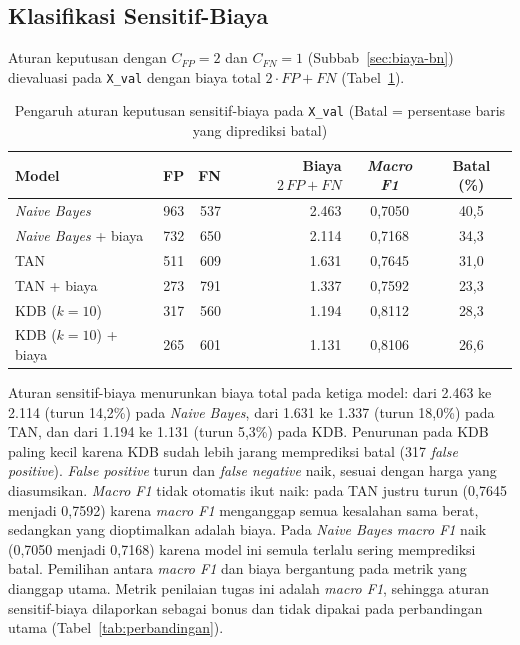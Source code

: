 \subsection{Klasifikasi Sensitif-Biaya}

Aturan keputusan dengan $C_{FP}=2$ dan $C_{FN}=1$ (Subbab~\ref{sec:biaya-bn}) dievaluasi pada
\texttt{X\_val} dengan biaya total $2\cdot FP+FN$ (Tabel~\ref{tab:biaya-bn}).

\begin{table}[H]
	\centering
	\caption{Pengaruh aturan keputusan sensitif-biaya pada \texttt{X\_val} (Batal = persentase baris yang diprediksi batal)}
	\label{tab:biaya-bn}
	\small
	\begin{tabular}{l r r r c c}
		\toprule
		\textbf{Model} & \textbf{FP} & \textbf{FN} & \textbf{Biaya $2\,FP+FN$} & \textbf{\textit{Macro F1}} & \textbf{Batal (\%)} \\
		\midrule
		\textit{Naive Bayes}              & 963 & 537 & 2.463 & 0,7050 & 40,5 \\
		\textit{Naive Bayes} + biaya      & 732 & 650 & 2.114 & 0,7168 & 34,3 \\
		TAN                               & 511 & 609 & 1.631 & 0,7645 & 31,0 \\
		TAN + biaya                       & 273 & 791 & 1.337 & 0,7592 & 23,3 \\
		KDB ($k=10$)                      & 317 & 560 & 1.194 & 0,8112 & 28,3 \\
		KDB ($k=10$) + biaya              & 265 & 601 & 1.131 & 0,8106 & 26,6 \\
		\bottomrule
	\end{tabular}
\end{table}

Aturan sensitif-biaya menurunkan biaya total pada ketiga model: dari 2.463 ke 2.114
(turun 14,2\%) pada \textit{Naive Bayes}, dari 1.631 ke 1.337 (turun 18,0\%)
pada TAN, dan dari 1.194 ke 1.131 (turun 5,3\%) pada KDB. Penurunan pada KDB
paling kecil karena KDB sudah lebih jarang memprediksi batal (317
\textit{false positive}). \textit{False positive} turun dan \textit{false negative}
naik, sesuai dengan harga yang diasumsikan. \textit{Macro F1} tidak otomatis ikut
naik: pada TAN justru turun (0,7645 menjadi 0,7592) karena \textit{macro F1}
menganggap semua kesalahan sama berat, sedangkan yang dioptimalkan adalah biaya.
Pada \textit{Naive Bayes} \textit{macro F1} naik (0,7050 menjadi 0,7168) karena
model ini semula terlalu sering memprediksi batal. Pemilihan antara
\textit{macro F1} dan biaya bergantung pada metrik yang dianggap utama. Metrik
penilaian tugas ini adalah \textit{macro F1}, sehingga aturan sensitif-biaya
dilaporkan sebagai bonus dan tidak dipakai pada perbandingan utama
(Tabel~\ref{tab:perbandingan}).

